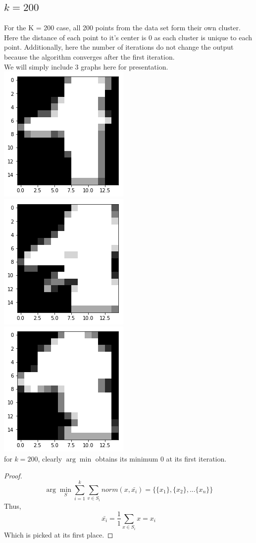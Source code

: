 \documentclass{article}
\begin{document}
\subsection{$k = 200$}
For the K = 200 case, all 200 points from the data set form their own cluster. Here the distance of each point to it's center is 0 as each cluster is unique to each point. Additionally, here the number of  iterations do not change the output because the algorithm converges after the first iteration.\\
We will simply include 3 graphs here for presentation. \\
\includegraphics{k_200_1.png} \\
\includegraphics{k_200_2.png} \\
\includegraphics{k_200_3.png} \\
for $k = 200$, clearly $\arg\min$ obtains its minimum 0 at its first iteration.
\begin{proof}
    $$ \arg\min_{S} \sum_{i = 1}^{k} \sum_{v \in S_i} norm(x, \bar{x_i}) = \{\{x_1\}, \{x_2\},... \{x_n\}\} $$
    Thus,
    $$ \bar{x_i} = \frac{1}{1} \sum_{ x \in S_i} x = x_i $$
    Which is picked at its first place.
\end{proof}
\end{document}
